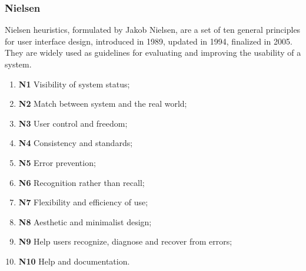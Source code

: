 \subsubsection{Nielsen}
Nielsen heuristics, formulated by Jakob Nielsen, are a set of ten general principles for user interface design, introduced in 1989, updated in 1994, finalized in 2005. They are widely used as guidelines for evaluating and improving the usability of a system.
\begin{enumerate}
	\item \textbf{N1} Visibility of system status;
	\item \textbf{N2} Match between system and the real world;
	\item \textbf{N3} User control and freedom;
	\item \textbf{N4} Consistency and standards;
	\item \textbf{N5} Error prevention;
	\item \textbf{N6} Recognition rather than recall;
	\item \textbf{N7} Flexibility and efficiency of use;
	\item \textbf{N8} Aesthetic and minimalist design;
	\item \textbf{N9} Help users recognize, diagnose and recover from errors;
	\item \textbf{N10} Help and documentation.
\end{enumerate}

